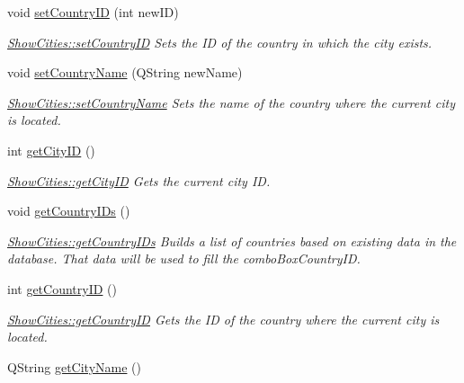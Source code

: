 \begin{DoxyCompactItemize}
void \hyperlink{class_show_cities_a853a958ebc2c0d42d872c237d431fe25}{set\+Country\+ID} (int new\+ID)
\begin{DoxyCompactList}\small\item\em \hyperlink{class_show_cities_a853a958ebc2c0d42d872c237d431fe25}{Show\+Cities\+::set\+Country\+ID} Sets the ID of the country in which the city exists. \end{DoxyCompactList}\item 
void \hyperlink{class_show_cities_a6974ab22950cede9fb290490bcc8f3a5}{set\+Country\+Name} (Q\+String new\+Name)
\begin{DoxyCompactList}\small\item\em \hyperlink{class_show_cities_a6974ab22950cede9fb290490bcc8f3a5}{Show\+Cities\+::set\+Country\+Name} Sets the name of the country where the current city is located. \end{DoxyCompactList}\item 
int \hyperlink{class_show_cities_ac81b38d6862643619d07f82fe12b5c02}{get\+City\+ID} ()
\begin{DoxyCompactList}\small\item\em \hyperlink{class_show_cities_ac81b38d6862643619d07f82fe12b5c02}{Show\+Cities\+::get\+City\+ID} Gets the current city ID. \end{DoxyCompactList}\item 
\mbox{\label{class_show_cities_a8fa42e8a5b12579cd04ae2a8ee4a9370}} 
void \hyperlink{class_show_cities_a8fa42e8a5b12579cd04ae2a8ee4a9370}{get\+Country\+I\+Ds} ()
\begin{DoxyCompactList}\small\item\em \hyperlink{class_show_cities_a8fa42e8a5b12579cd04ae2a8ee4a9370}{Show\+Cities\+::get\+Country\+I\+Ds} Builds a list of countries based on existing data in the database. That data will be used to fill the combo\+Box\+Country\+ID. \end{DoxyCompactList}\item 
int \hyperlink{class_show_cities_a8f66380734928e926a732a0088c1d998}{get\+Country\+ID} ()
\begin{DoxyCompactList}\small\item\em \hyperlink{class_show_cities_a8f66380734928e926a732a0088c1d998}{Show\+Cities\+::get\+Country\+ID} Gets the ID of the country where the current city is located. \end{DoxyCompactList}\item 
Q\+String \hyperlink{class_show_cities_a3640b91c66939d0070c3dd6f5b9eb93c}{get\+City\+Name} ()

\end{DoxyCompactItemize}
